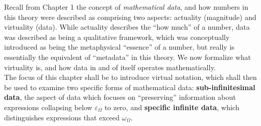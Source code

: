 \documentclass{article}
\begin{document}
Recall from Chapter 1 the concept of \textit{mathematical data}, and how numbers in this theory were described as comprising two aspects: actuality (magnitude) and virtuality (data). While actuality describes the ``how much'' of a number, data was described as being a qualitative framework, which was conceptually introduced as being the metaphysical ``essence'' of a number, but really is essentially the equivalent of ``metadata'' in this theory. We now formalize what virtuality is, and how data in and of itself operates mathematically.\\The focus of this chapter shall be to introduce virtual notation, which shall then be used to examine two specific forms of mathematical data: \textbf{sub-infinitesimal data}, the aspect of data which focuses on ``preserving'' information about expressions collapsing below $\varepsilon_\Omega$ to zero, and \textbf{specific infinite data}, which distinguishes expressions that exceed $\omega_\Omega$. 
\end{document}
